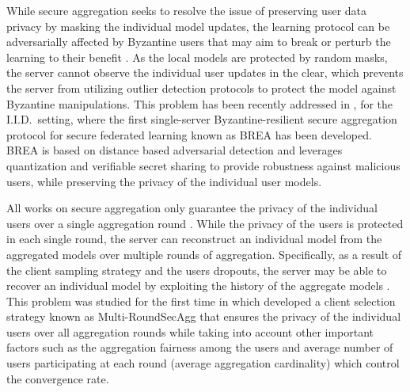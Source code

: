  While secure aggregation seeks to resolve the issue of preserving user data privacy by masking the individual model updates, the learning protocol can be adversarially affected by Byzantine users that may aim to break or perturb the learning to their benefit \cite{blanchard2017machine,so2020byzantine,he2020secure,prakash2020mitigating,khazbak2020mlguard}.  As the local models are protected by random masks, the server cannot observe the individual user updates in the clear, which prevents the server from utilizing outlier detection protocols to protect the model against Byzantine manipulations. This problem has been recently addressed in \cite{so2020byzantine}, for the I.I.D.~setting, where the first single-server Byzantine-resilient secure aggregation protocol for secure federated learning known as BREA has been developed. BREA is based on distance based adversarial detection and leverages quantization and verifiable secret sharing to provide robustness against malicious users, while preserving the privacy of the individual user models.  
 
 
 All works on secure aggregation only guarantee the privacy of the individual users over a single aggregation round \cite{bonawitz2017practical,so2021turbo,kadhe2020fastsecagg,zhao2021information,bell2020secure}. While the privacy of the users is protected in each single round, the server can reconstruct an individual model from the aggregated models over multiple rounds of aggregation. Specifically, as a result of the client sampling strategy and the users dropouts, the server may be able to recover an individual model by exploiting the history of the aggregate models \cite{pejo2020quality, so2021securing}. This problem was studied for the first time in \cite{so2021securing} which  developed a client selection strategy known as Multi-RoundSecAgg that ensures the privacy of the individual users over all aggregation rounds while taking into account other important factors such as the aggregation fairness among the users and average number of users participating at each round (average aggregation cardinality) which control the convergence rate. 
 
 







